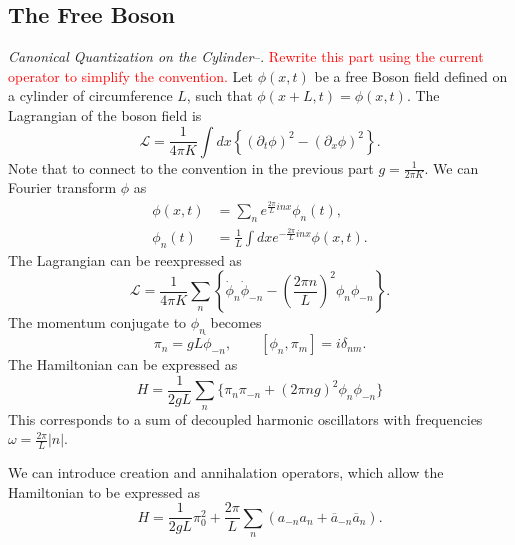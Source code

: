 \documentclass[submission, PhysLectNotes]{SciPost}
\begin{document}
\subsection{The Free Boson}
\textit{Canonical Quantization on the Cylinder}--.
\textcolor{red}{Rewrite this part using the current operator to simplify the convention.}
Let $\phi(x,t)$ be a free Boson field defined on a cylinder of circumference $L$, such that $\phi(x+L,t) = \phi(x,t)$. The Lagrangian of the boson field is
\begin{equation}
  \mathcal{L} = \frac{1}{4\pi K}\int dx \left\{{(\partial_t\phi)}^2 - {(\partial_x \phi)}^2\right\}.
\end{equation}
Note that to connect to the convention in the previous part $g = \frac{1}{2\pi K}$.
We can Fourier transform $\phi$ as
\begin{align}
  \phi(x,t) &= \sum_n e^{\frac{2\pi}{L}inx}\phi_n(t), \\
  \phi_n(t) &= \frac{1}{L}\int dx e^{-\frac{2\pi}{L}inx}\phi(x,t).
\end{align}
The Lagrangian can be reexpressed as
\begin{equation}
  \mathcal{L} = \frac{1}{4\pi K}\sum_n\left\{\dot{\phi}_n\dot{\phi}_{-n}-{\left(\frac{2\pi n}{L}\right)}^2\phi_n\phi_{-n}\right\}.
\end{equation}
The momentum conjugate to $\phi_n$ becomes
\begin{equation}
  \pi_n = gL\dot{\phi}_{-n}, \qquad [\phi_n,\pi_m] = i\delta_{nm}.
\end{equation}
The Hamiltonian can be expressed as
\begin{equation}
  H = \frac{1}{2gL}\sum_n\{\pi_n\pi_{-n}+{(2\pi ng)}^2\phi_n\phi_{-n}\}
\end{equation}
This corresponds to a sum of decoupled harmonic oscillators with frequencies $\omega = \frac{2\pi}{L}\lvert n\rvert$.

We can introduce creation and annihalation operators, which allow the Hamiltonian to be expressed as
\begin{equation}
  H = \frac{1}{2gL}\pi_0^2+\frac{2\pi}{L}\sum_n\left(a_{-n}a_n+\overline{a}_{-n}\overline{a}_n\right).
\end{equation}
\end{document}
